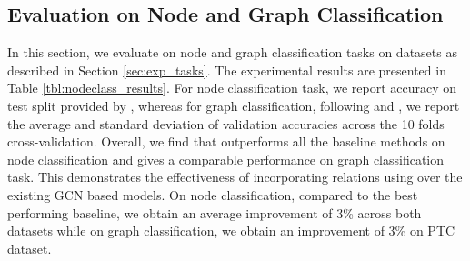 \documentclass{article} \usepackage{iclr2020_conference,times}
\begin{document}
\vspace{-1mm}
\subsection{Evaluation on Node and Graph Classification}
\label{sec:res_node_nmt}
\vspace{-1mm}
In this section, we evaluate \method{} on node and graph classification tasks on datasets as described in Section \ref{sec:exp_tasks}. The experimental results are presented in Table \ref{tbl:nodeclass_results}. For node classification task, we report accuracy on test split provided by \cite{node_class_splits}, whereas for graph classification, following \cite{graph_datasets} and \cite{gin}, we report the average and standard deviation of validation accuracies across the 10 folds cross-validation.  Overall, we find that \method{} outperforms all the baseline methods on node classification and gives a comparable performance on graph classification task. This demonstrates the effectiveness of incorporating relations using \method{} over the existing GCN based models. On node classification, compared to the best performing baseline, we obtain an average improvement of $3$\% across both datasets while on graph classification, we obtain an improvement of $3$\% on PTC dataset.
\end{document}
